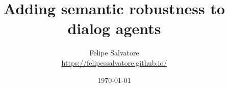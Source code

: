 \title{Adding semantic robustness to dialog agents} 

\date{\today}

\vspace{1.0 cm}

\author{
  Felipe Salvatore\\
  \url{https://felipessalvatore.github.io/}\vspace{1.8 cm}
}



